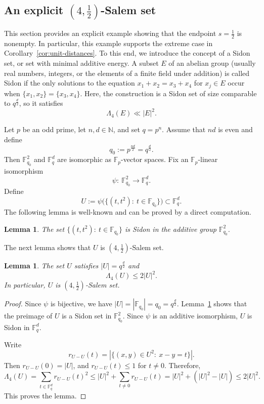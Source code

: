 \documentclass{article}
\newtheorem{lemma}[theorem]{Lemma}
\begin{document}

\subsection{An explicit $(4,\frac12)$-Salem set}\label{sec:explicit-sidon}
This section provides an explicit example showing that the endpoint $s=\frac12$ is nonempty. In particular, this example supports the extreme case in Corollary~\ref{cor:unit-distances}. To this end, we introduce the concept of a Sidon set, or set with minimal additive energy. A subset $E$ of an abelian group (usually real numbers, integers, or the elements of a finite field under addition) is called Sidon if the only solutions to the equation $x_1+x_2 = x_3+x_4$ for $x_j\in E$ occur when $\{x_1,x_2\} = \{x_3,x_4\}.$ Here, the construction is a Sidon set of size comparable to $q^{\frac d2}$, so it satisfies
\[
\Lambda_4(E)\ll |E|^2.
\]

Let $p$ be an odd prime, let $n,d\in\mathbb{N}$, and set $q=p^n$.
Assume that $nd$ is even and define
\[
q_0:=p^{\frac{nd}{2}}=q^{\frac d2}.
\]
Then $\mathbb{F}_{q_0}^2$ and $\mathbb{F}_q^d$ are isomorphic as $\mathbb{F}_p$-vector spaces.
Fix an $\mathbb{F}_p$-linear isomorphism
\[
\psi:\ \mathbb{F}_{q_0}^2\to \mathbb{F}_q^d.
\]
Define
\[
U
:=
\psi\bigl(\{(t,t^2):\ t\in\mathbb{F}_{q_0}\}\bigr)
\subset \mathbb{F}_q^d.
\]
The following lemma is well-known and can be proved by a direct computation.

\begin{lemma}\label{lem:sidon-graph}
The set $\{(t,t^2):\ t\in\mathbb{F}_{q_0}\}$ is Sidon in the additive group $\mathbb{F}_{q_0}^2$.
\end{lemma}
The next lemma shows that $U$ is $(4, \frac{1}{2})$-Salem set.
\begin{lemma}\label{lem:U-size-energy}
The set $U$ satisfies $|U|=q^{\frac d2}$ and
\[
\Lambda_4(U)\le 2|U|^2.
\]
In particular, $U$ is $(4, \frac{1}{2})$-Salem set.
\end{lemma}

\begin{proof}
Since $\psi$ is bijective, we have $|U|=|\mathbb{F}_{q_0}|=q_0=q^{\frac d2}$.
Lemma~\ref{lem:sidon-graph} shows that the preimage of $U$ is a Sidon set in $\mathbb{F}_{q_0}^2$.
Since $\psi$ is an additive isomorphism, $U$ is Sidon in $\mathbb{F}_q^d$.

Write
\[
r_{U-U}(t)=|\{(x,y)\in U^2:\ x-y=t\}|.
\]
Then $r_{U-U}(0)=|U|$, and $r_{U-U}(t)\le 1$ for $t\ne 0$.
Therefore,
\[
\Lambda_4(U)=\sum_{t\in\mathbb{F}_q^d} r_{U-U}(t)^2
\le
|U|^2+\sum_{t\ne 0} r_{U-U}(t)
=
|U|^2+(|U|^2-|U|)
\le
2|U|^2.
\]
This proves the lemma.
\end{proof}
\end{document}
